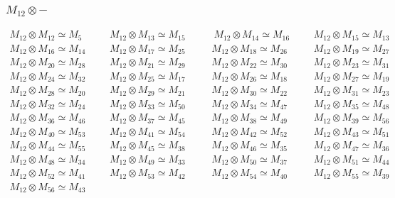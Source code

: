 \subsubsection{$M_12\otimes -$}
\begin{align*}
M_{12} \otimes M_{12} \simeq M_{5} &&& M_{12} \otimes M_{13} \simeq M_{15} &&&\
 M_{12} \otimes M_{14} \simeq M_{16} &&& M_{12} \otimes M_{15} \simeq M_{13}\\
M_{12} \otimes M_{16} \simeq M_{14} &&& M_{12} \otimes M_{17} \simeq M_{25} &&\
& M_{12} \otimes M_{18} \simeq M_{26} &&& M_{12} \otimes M_{19} \simeq M_{27}\
\\
M_{12} \otimes M_{20} \simeq M_{28} &&& M_{12} \otimes M_{21} \simeq M_{29} &&\
& M_{12} \otimes M_{22} \simeq M_{30} &&& M_{12} \otimes M_{23} \simeq M_{31}\
\\
M_{12} \otimes M_{24} \simeq M_{32} &&& M_{12} \otimes M_{25} \simeq M_{17} &&\
& M_{12} \otimes M_{26} \simeq M_{18} &&& M_{12} \otimes M_{27} \simeq M_{19}\
\\
M_{12} \otimes M_{28} \simeq M_{20} &&& M_{12} \otimes M_{29} \simeq M_{21} &&\
& M_{12} \otimes M_{30} \simeq M_{22} &&& M_{12} \otimes M_{31} \simeq M_{23}\
\\
M_{12} \otimes M_{32} \simeq M_{24} &&& M_{12} \otimes M_{33} \simeq M_{50} &&\
& M_{12} \otimes M_{34} \simeq M_{47} &&& M_{12} \otimes M_{35} \simeq M_{48}\
\\
M_{12} \otimes M_{36} \simeq M_{46} &&& M_{12} \otimes M_{37} \simeq M_{45} &&\
& M_{12} \otimes M_{38} \simeq M_{49} &&& M_{12} \otimes M_{39} \simeq M_{56}\
\\
M_{12} \otimes M_{40} \simeq M_{53} &&& M_{12} \otimes M_{41} \simeq M_{54} &&\
& M_{12} \otimes M_{42} \simeq M_{52} &&& M_{12} \otimes M_{43} \simeq M_{51}\
\\
M_{12} \otimes M_{44} \simeq M_{55} &&& M_{12} \otimes M_{45} \simeq M_{38} &&\
& M_{12} \otimes M_{46} \simeq M_{35} &&& M_{12} \otimes M_{47} \simeq M_{36}\
\\
M_{12} \otimes M_{48} \simeq M_{34} &&& M_{12} \otimes M_{49} \simeq M_{33} &&\
& M_{12} \otimes M_{50} \simeq M_{37} &&& M_{12} \otimes M_{51} \simeq M_{44}\
\\
M_{12} \otimes M_{52} \simeq M_{41} &&& M_{12} \otimes M_{53} \simeq M_{42} &&\
& M_{12} \otimes M_{54} \simeq M_{40} &&& M_{12} \otimes M_{55} \simeq M_{39}\
\\
M_{12} \otimes M_{56} \simeq M_{43}\\
\end{align*}

